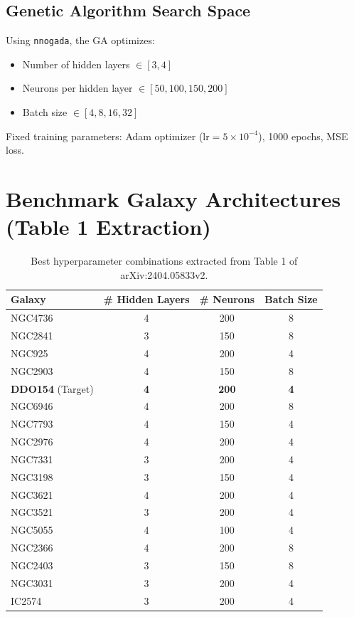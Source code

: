 \documentclass[11pt,a4paper]{article}
\begin{document}
\subsection{Genetic Algorithm Search Space}
Using \texttt{nnogada}, the GA optimizes:
\begin{itemize}
    \item Number of hidden layers $\in [3, 4]$
    \item Neurons per hidden layer $\in [50, 100, 150, 200]$
    \item Batch size $\in [4, 8, 16, 32]$
\end{itemize}
Fixed training parameters: Adam optimizer ($\text{lr}=5\times 10^{-4}$), 1000 epochs, MSE loss.

\section{Benchmark Galaxy Architectures (Table 1 Extraction)}

\begin{table}[h!]
\centering
\small
\begin{tabular}{l c c c}
\toprule
\textbf{Galaxy} & \textbf{\# Hidden Layers} & \textbf{\# Neurons} & \textbf{Batch Size} \\
\midrule
NGC4736 & 4 & 200 & 8 \\
NGC2841 & 3 & 150 & 8 \\
NGC925 & 4 & 200 & 4 \\
NGC2903 & 4 & 150 & 8 \\
\textbf{DDO154} (Target) & \textbf{4} & \textbf{200} & \textbf{4} \\
NGC6946 & 4 & 200 & 8 \\
NGC7793 & 4 & 150 & 4 \\
NGC2976 & 4 & 200 & 4 \\
NGC7331 & 3 & 200 & 4 \\
NGC3198 & 3 & 150 & 4 \\
NGC3621 & 4 & 200 & 4 \\
NGC3521 & 3 & 200 & 4 \\
NGC5055 & 4 & 100 & 4 \\
NGC2366 & 4 & 200 & 8 \\
NGC2403 & 3 & 150 & 8 \\
NGC3031 & 3 & 200 & 4 \\
IC2574 & 3 & 200 & 4 \\
\bottomrule
\end{tabular}
\caption{Best hyperparameter combinations extracted from Table 1 of arXiv:2404.05833v2.}
\end{table}
\end{document}

